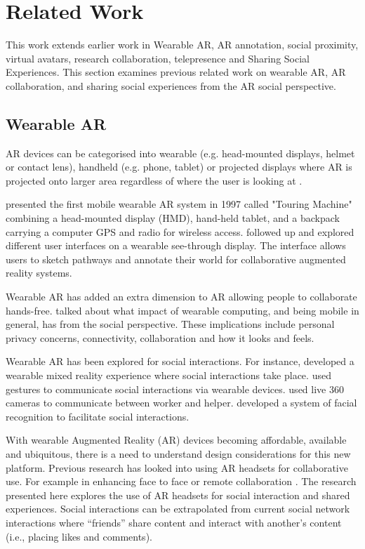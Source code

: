 \chapter{Related Work} %

\label{ch:background} %
This work extends earlier work in Wearable AR, AR annotation, social proximity, virtual avatars, research collaboration, telepresence and Sharing Social Experiences. This section examines previous related work on wearable AR, AR collaboration, and sharing social experiences from the AR social perspective. 

\section{Wearable AR} 

AR devices can be categorised into wearable (e.g. head-mounted displays, helmet or contact lens), handheld (e.g. phone, tablet) or projected displays where AR is projected onto larger area regardless of where the user is looking at \cite{Peddie2017}. 

\cite{Feiner1997a} presented the first mobile wearable AR system in 1997 called "Touring Machine" combining a head-mounted display (HMD), hand-held tablet, and a backpack carrying a computer GPS and radio for wireless access. \cite{Hollerer1999} followed up and explored different user interfaces on a wearable see-through display. The interface allows users to sketch pathways and annotate their world for collaborative augmented reality systems. 

Wearable AR has added an extra dimension to AR allowing people to collaborate hands-free. \cite{Feiner1999} talked about what impact of wearable computing, and being mobile in general, has from the social perspective. These implications include personal privacy concerns, connectivity, collaboration and how it looks and feels. 

Wearable AR has been explored for social interactions. For instance, \cite{Cheok2002a} developed a wearable mixed reality experience where social interactions take place. \cite{Amores2015} used gestures to communicate social interactions via wearable devices. \cite{Lee2019} used live 360 cameras to communicate between worker and helper. \cite{Shu2018} developed a system of facial recognition to facilitate social interactions. 

With wearable Augmented Reality (AR) devices becoming affordable, available and ubiquitous, there is a need to understand design considerations for this new platform. Previous research has looked into using AR headsets for collaborative use. For example in enhancing face to face \cite{Billinghurst2002} or remote collaboration \cite{Gupta2016}. The research presented here explores the use of AR headsets for social interaction and shared experiences. Social interactions can be extrapolated from current social network interactions where \enquote{friends} share content and interact with another's content (i.e., placing likes and comments).

